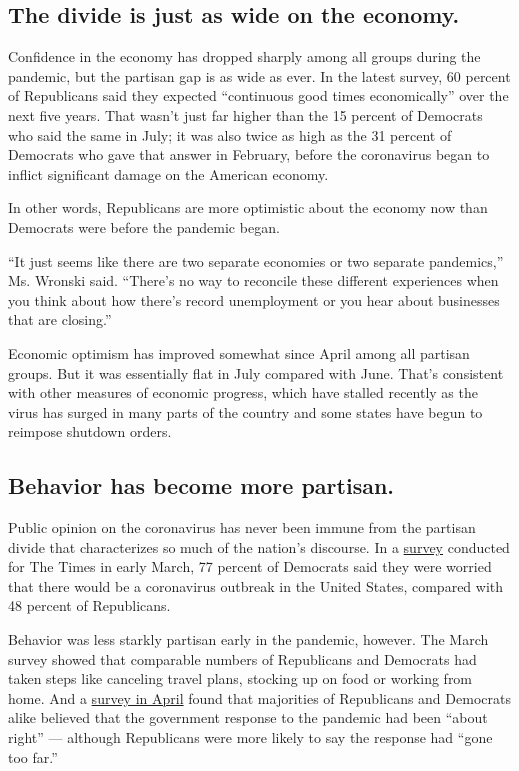 \hypertarget{the-divide-is-just-as-wide-on-the-economy}{%
\subsection{The divide is just as wide on the
economy.}\label{the-divide-is-just-as-wide-on-the-economy}}

Confidence in the economy has dropped sharply among all groups during
the pandemic, but the partisan gap is as wide as ever. In the latest
survey, 60 percent of Republicans said they expected ``continuous good
times economically'' over the next five years. That wasn't just far
higher than the 15 percent of Democrats who said the same in July; it
was also twice as high as the 31 percent of Democrats who gave that
answer in February, before the coronavirus began to inflict significant
damage on the American economy.

In other words, Republicans are more optimistic about the economy now
than Democrats were before the pandemic began.

``It just seems like there are two separate economies or two separate
pandemics,'' Ms. Wronski said. ``There's no way to reconcile these
different experiences when you think about how there's record
unemployment or you hear about businesses that are closing.''

Economic optimism has improved somewhat since April among all partisan
groups. But it was essentially flat in July compared with June. That's
consistent with other measures of economic progress, which have stalled
recently as the virus has surged in many parts of the country and some
states have begun to reimpose shutdown orders.

\hypertarget{behavior-has-become-more-partisan}{%
\subsection{Behavior has become more
partisan.}\label{behavior-has-become-more-partisan}}

Public opinion on the coronavirus has never been immune from the
partisan divide that characterizes so much of the nation's discourse. In
a
\href{https://www.surveymonkey.com/curiosity/nyt-march-2020-cci/}{survey}
conducted for The Times in early March, 77 percent of Democrats said
they were worried that there would be a coronavirus outbreak in the
United States, compared with 48 percent of Republicans.

Behavior was less starkly partisan early in the pandemic, however. The
March survey showed that comparable numbers of Republicans and Democrats
had taken steps like canceling travel plans, stocking up on food or
working from home. And a
\href{https://www.surveymonkey.com/curiosity/nyt-april-2020-cci/}{survey
in April} found that majorities of Republicans and Democrats alike
believed that the government response to the pandemic had been ``about
right'' --- although Republicans were more likely to say the response
had ``gone too far.''

